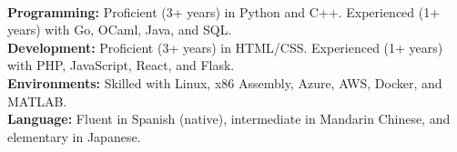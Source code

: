 \documentclass[11pt]{article}
\begin{document}
   \vspace{-7pt}\\
   \noindent\makebox[\linewidth]{\rule{7.5in}{0.3pt}}
   \textbf{Programming:} Proficient (3+ years) in Python and C++. Experienced (1+ years) with Go, OCaml, Java, and SQL.\\
   \textbf{Development:} Proficient (3+ years) in HTML/CSS. Experienced (1+ years) with PHP, JavaScript, React, and Flask.\\
   \textbf{Environments:} Skilled with Linux, x86 Assembly, Azure, AWS, Docker, and MATLAB.\\
   \textbf{Language:} 
     Fluent in Spanish (native), intermediate in Mandarin Chinese, and elementary in Japanese.
\end{document}
